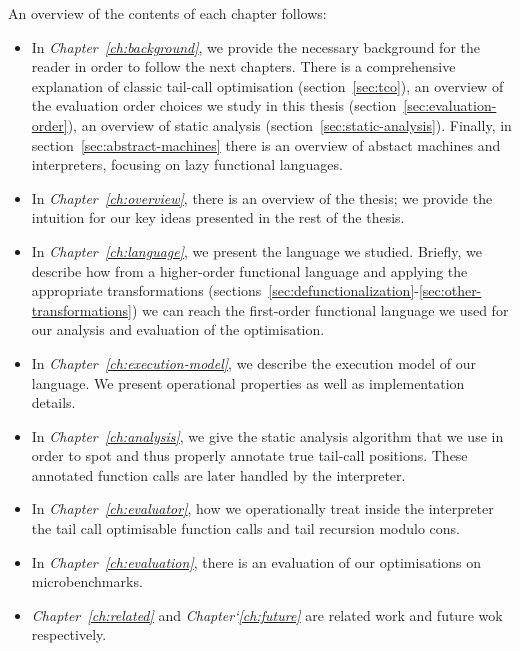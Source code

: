 \documentclass[diploma]{softlab-thesis}
\begin{document}
An overview of the contents of each chapter follows:
\begin{itemize}
  \item In \textit{Chapter~\ref{ch:background}}, we provide the necessary background for the reader in 
        order to follow the next chapters. There is a comprehensive explanation of classic 
        tail-call optimisation (section~\ref{sec:tco}), an overview of the evaluation order choices we study 
        in this thesis (section~\ref{sec:evaluation-order}), an overview of static analysis (section~\ref{sec:static-analysis}). Finally, 
        in section~\ref{sec:abstract-machines} there is an overview of abstact machines and interpreters, focusing on 
        lazy functional languages.

  \item In \textit{Chapter~\ref{ch:overview}}, there is an overview of the thesis; we provide the intuition 
        for our key ideas presented in the rest of the thesis.

  \item In \textit{Chapter~\ref{ch:language}}, we present the language we studied. Briefly, we describe 
        how from a higher-order functional language and applying the appropriate 
        transformations (sections~\ref{sec:defunctionalization}-\ref{sec:other-transformations}) we can reach the first-order functional 
        language we used for our analysis and evaluation of the optimisation.

  \item In \textit{Chapter~\ref{ch:execution-model}}, we describe the execution model of our language. We present operational 
        properties as well as implementation details.

  \item In \textit{Chapter~\ref{ch:analysis}}, we give the static analysis algorithm that we use in order to spot 
        and thus properly annotate true tail-call positions. These annotated function calls 
        are later handled by the interpreter.

  \item In \textit{Chapter~\ref{ch:evaluator}}, how we operationally treat inside the interpreter the 
        tail call optimisable function calls and tail recursion modulo cons.

  \item In \textit{Chapter~\ref{ch:evaluation}}, there is an evaluation of our optimisations on microbenchmarks.

  \item \textit{Chapter~\ref{ch:related}} and \textit{Chapter`\ref{ch:future}} are related work and future wok respectively.

\end{itemize}
\end{document}
